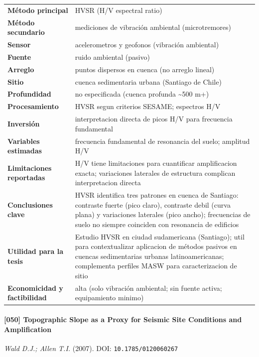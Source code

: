 \begin{center}\scriptsize
\begin{tabularx}{\textwidth}{@{}>{\bfseries}p{3.3cm} X@{}}
\toprule
M\'etodo principal & HVSR (H/V espectral ratio) \\
M\'etodo secundario & mediciones de vibración ambiental (microtremores) \\
Sensor & acelerometros y geofonos (vibración ambiental) \\
Fuente & ruido ambiental (pasivo) \\
Arreglo & puntos dispersos en cuenca (no arreglo lineal) \\
Sitio & cuenca sedimentaria urbana (Santiago de Chile) \\
Profundidad & no especificada (cuenca profunda \textasciitilde{}500 m+) \\
Procesamiento & HVSR segun criterios SESAME; espectros H/V \\
Inversi\'on & interpretacion directa de picos H/V para frecuencia fundamental \\
Variables estimadas & frecuencia fundamental de resonancia del suelo; amplitud H/V \\
Limitaciones reportadas & H/V tiene limitaciones para cuantificar amplificacion exacta; variaciones laterales de estructura complican interpretacion directa \\
Conclusiones clave & HVSR identifica tres patrones en cuenca de Santiago: contraste fuerte (pico claro), contraste debil (curva plana) y variaciones laterales (pico ancho); frecuencias de suelo no siempre coinciden con resonancia de edificios \\
Utilidad para la tesis & Estudio HVSR en ciudad sudamericana (Santiago); util para contextualizar aplicacion de métodos pasivos en cuencas sedimentarias urbanas latinoamericanas; complementa perfiles MASW para caracterizacion de sitio \\
Economicidad y factibilidad & alta (solo vibración ambiental; sin fuente activa; equipamiento minimo) \\
\bottomrule
\end{tabularx}
\end{center}

\paragraph{[050] Topographic Slope as a Proxy for Seismic Site Conditions and Amplification} \emph{Wald D.J.; Allen T.I.} (2007).
{\scriptsize DOI: \texttt{10.1785/0120060267}}


